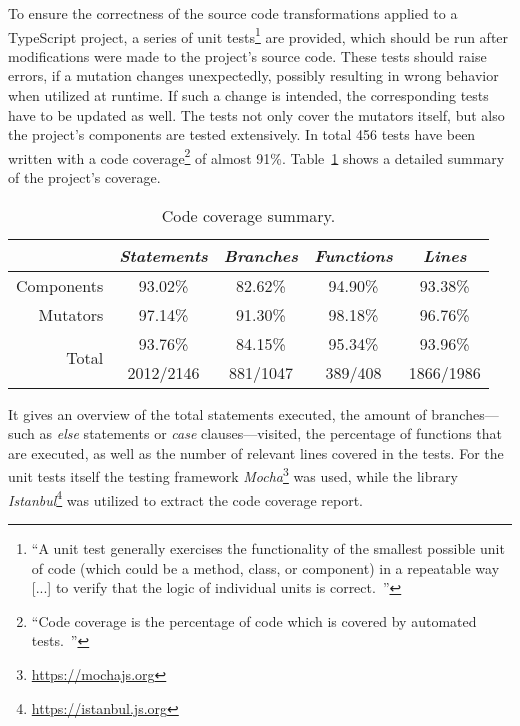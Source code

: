 To ensure the correctness of the source code transformations applied to a TypeScript project, a series of unit tests\footnote{``A unit test generally exercises the functionality of the smallest possible unit of code (which could be a method, class, or component) in a repeatable way~\cite{UnitTests:Android} [...] to verify that the logic of individual units is correct.~\cite{UnitTests:Android}''} are provided, which should be run after modifications were made to the project's source code. These tests should raise errors, if a mutation changes unexpectedly, possibly resulting in wrong behavior when utilized at runtime. If such a change is intended, the corresponding tests have to be updated as well. The tests not only cover the mutators itself, but also the project's components are tested extensively. In total 456 tests have been written with a code coverage\footnote{``Code coverage is the percentage of code which is covered by automated tests.~\cite{CodeCoverage:Atlassian}''} of almost 91\%. Table~\ref{tab:code-coverage} shows a detailed summary of the project's coverage.
\begin{table}
\caption{Code coverage summary.}
\label{tab:code-coverage}
\centering
\setlength{\tabcolsep}{5mm}
\def\arraystretch{1.25}
\small
\begin{tabular}{|r||c|c|c|c|}
    \hline
    & \emph{Statements} & \emph{Branches} & \emph{Functions} & \emph{Lines} \\
    \hline
    \hline
    Components & 93.02\% & 82.62\% & 94.90\% & 93.38\% \\
    \hline
    Mutators & 97.14\% & 91.30\% & 98.18\% & 96.76\% \\
    \hline
    \hline
    \multicolumn{1}{|r||}{\multirow{2}{*}{Total}} & 93.76\% & 84.15\% & 95.34\% & 93.96\% \\
    \cline{2-5}
    \multicolumn{1}{|c||}{} & 2012/2146 & 881/1047 & 389/408 & 1866/1986 \\
    \hline
  \end{tabular}
\end{table}
It gives an overview of the total statements executed, the amount of branches---such as \emph{else} statements or \emph{case} clauses---visited, the percentage of functions that are executed, as well as the number of relevant lines covered in the tests. For the unit tests itself the testing framework \emph{Mocha}\footnote{\url{https://mochajs.org}} was used, while the library \emph{Istanbul}\footnote{\url{https://istanbul.js.org}} was utilized to extract the code coverage report.

